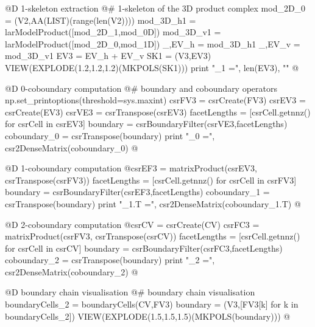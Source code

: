 \documentclass[11pt,oneside]{article}	%
\begin{document}
@D 1-skeleton extraction 
@{# 1-skeleton of the 3D product complex 
mod_2D_0 = (V2,AA(LIST)(range(len(V2))))
mod_3D_h1 = larModelProduct([mod_2D_1,mod_0D])
mod_3D_v1 = larModelProduct([mod_2D_0,mod_1D])
_,EV_h = mod_3D_h1
_,EV_v = mod_3D_v1
EV3 = EV_h + EV_v
SK1 = (V3,EV3)
VIEW(EXPLODE(1.2,1.2,1.2)(MKPOLS(SK1)))
print "\nk_1 =", len(EV3), "\n"
@}

@D 0-coboundary computation
@{# boundary and coboundary operators
np.set_printoptions(threshold=sys.maxint)
csrFV3 = csrCreate(FV3)
csrEV3 = csrCreate(EV3)
csrVE3 = csrTranspose(csrEV3)
facetLengths = [csrCell.getnnz() for csrCell in csrEV3]
boundary = csrBoundaryFilter(csrVE3,facetLengths)
coboundary_0 = csrTranspose(boundary)
print "\ncoboundary_0 =\n", csr2DenseMatrix(coboundary_0)
@}

@D 1-coboundary computation
@{csrEF3 = matrixProduct(csrEV3, csrTranspose(csrFV3))
facetLengths = [csrCell.getnnz() for csrCell in csrFV3]
boundary = csrBoundaryFilter(csrEF3,facetLengths)
coboundary_1 = csrTranspose(boundary)
print "\ncoboundary_1.T =\n", csr2DenseMatrix(coboundary_1.T)
@}

@D 2-coboundary computation
@{csrCV = csrCreate(CV)
csrFC3 = matrixProduct(csrFV3, csrTranspose(csrCV))
facetLengths = [csrCell.getnnz() for csrCell in csrCV]
boundary = csrBoundaryFilter(csrFC3,facetLengths)
coboundary_2 = csrTranspose(boundary)
print "\ncoboundary_2 =\n", csr2DenseMatrix(coboundary_2)
@}

@D boundary chain visualisation
@{# boundary chain visualisation
boundaryCells_2 = boundaryCells(CV,FV3)
boundary = (V3,[FV3[k] for k in boundaryCells_2])
VIEW(EXPLODE(1.5,1.5,1.5)(MKPOLS(boundary)))
@}
\end{document}
